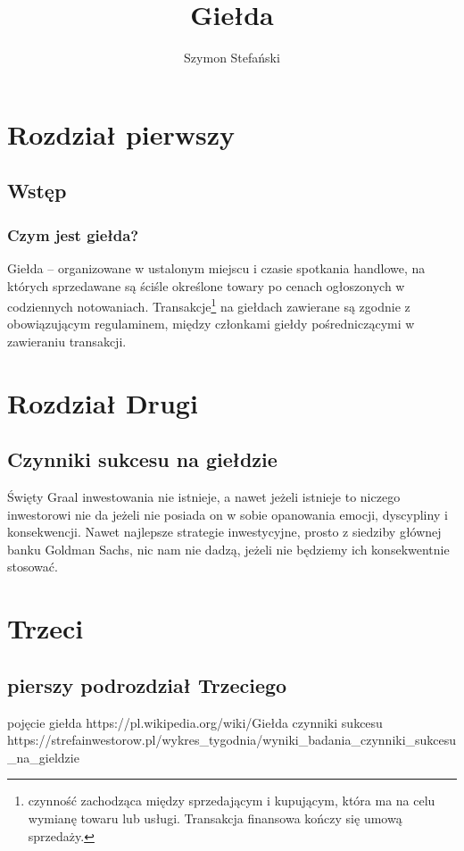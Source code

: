 \documentclass{report}
\title{Giełda}
\author{Szymon Stefański}
\begin{document}
\maketitle
\tableofcontents
\newpage
\chapter{Rozdział pierwszy}
\section{Wstęp}
\subsection{Czym jest giełda?}
Giełda – organizowane w ustalonym miejscu i czasie spotkania handlowe, na których sprzedawane są ściśle określone towary po cenach ogłoszonych w codziennych notowaniach. Transakcje\footnote{ czynność zachodząca między sprzedającym i kupującym, która ma na celu wymianę towaru lub usługi. Transakcja finansowa kończy się umową sprzedaży. } na giełdach zawierane są zgodnie z obowiązującym regulaminem, między członkami giełdy pośredniczącymi w zawieraniu transakcji. 
\newpage
\chapter{Rozdział Drugi}
\section{Czynniki sukcesu na giełdzie}
Święty Graal inwestowania nie istnieje, a nawet jeżeli istnieje to niczego inwestorowi nie da jeżeli nie posiada on w sobie opanowania emocji, dyscypliny i konsekwencji. Nawet najlepsze strategie inwestycyjne, prosto z siedziby głównej banku Goldman Sachs, nic nam nie dadzą, jeżeli nie będziemy ich konsekwentnie stosować.
\newpage
\chapter{Trzeci}
\section{pierszy podrozdział Trzeciego}
\begin{thebibliography}{99}
pojęcie giełda
https://pl.wikipedia.org/wiki/Giełda
czynniki sukcesu
https://strefainwestorow.pl/wykres\_tygodnia/wyniki\_badania\_czynniki\_sukcesu\_na\_gieldzie
\end{thebibliography}
\end{document}
